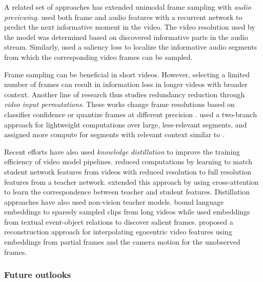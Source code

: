 A related set of approaches has extended unimodal frame sampling with \emph{audio previewing}. \citet{gao2020listen} used both frame and audio features with a recurrent network to predict the next informative moment in the video. The video resolution used by the model was determined based on discovered informative parts in the audio stream. Similarly, \citet{nugroho2023audio} used a saliency loss to localize the informative audio segments from which the corresponding video frames can be sampled. 

Frame sampling can be beneficial in short videos. However, selecting a limited number of frames can result in information loss in longer videos with broader context. Another line of research thus studies redundancy reduction through \emph{video input permutations}. These works change frame resolutions based on classifier confidence \citep{meng2020ar} or quantize frames at different precision \citep{abati2023resq,sun2021dynamic}. \citet{zhang2022look} used a two-branch approach for lightweight computations over large, less-relevant segments, and assigned more compute for segments with relevant context similar to \citep{feichtenhofer2019slowfast}.  

Recent efforts have also used \emph{knowledge distillation} to improve the training efficiency of video model pipelines. \citet{ma2022rethinking} reduced computations by learning to match student network features from videos with reduced resolution to full resolution features from a teacher network. \citet{kim2021efficient} extended this approach by using cross-attention to learn the correspondence between teacher and student features. Distillation approaches have also used non-vision teacher models. \citet{lei2021less} bound language embeddings to sparsely sampled clips from long videos while \citet{xia2022temporal} used embeddings from textual event-object relations to discover salient frames. \citet{tan2023egodistill} proposed a reconstruction approach for interpolating egocentric video features using embeddings from partial frames and the camera motion for the unobserved frames.

\subsubsection{Future outlooks} 

